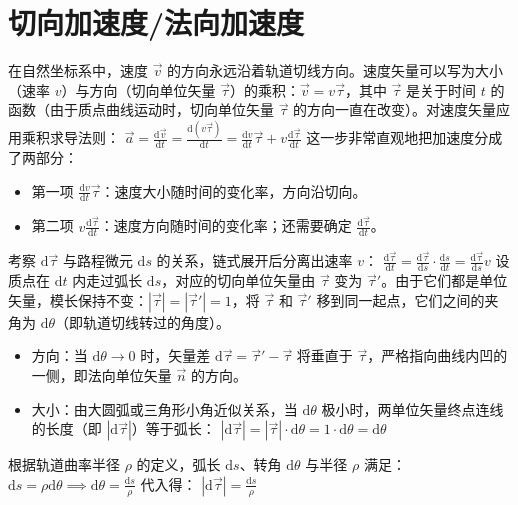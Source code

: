 \section{切向加速度/法向加速度}

在自然坐标系中，速度 $\vec{v}$ 的方向永远沿着轨道切线方向。速度矢量可以写为大小（速率 $v$）与方向（切向单位矢量 $\vec{\tau}$）的乘积：$\vec{v} = v\vec{\tau}$，其中 $\vec{\tau}$ 是关于时间 $t$ 的函数（由于质点曲线运动时，切向单位矢量 $\vec{\tau}$ 的方向一直在改变）。对速度矢量应用乘积求导法则： \(\vec{a} = \frac{\mathrm{d}\vec{v}}{\mathrm{d}t} = \frac{\mathrm{d}(v\vec{\tau})}{\mathrm{d}t} = \frac{\mathrm{d}v}{\mathrm{d}t}\vec{\tau} + v\frac{\mathrm{d}\vec{\tau}}{\mathrm{d}t}\) 
这一步非常直观地把加速度分成了两部分：
\begin{itemize}
\item 第一项 $\frac{\mathrm{d}v}{\mathrm{d}t}\vec{\tau}$：速度大小随时间的变化率，方向沿切向。
\item 第二项 $v\frac{\mathrm{d}\vec{\tau}}{\mathrm{d}t}$：速度方向随时间的变化率；还需要确定 $\frac{\mathrm{d}\vec{\tau}}{\mathrm{d}t}$。
\end{itemize}
考察 $\mathrm{d}\vec{\tau}$ 与路程微元 $\mathrm{d}s$ 的关系，链式展开后分离出速率 $v$：
 \(\frac{\mathrm{d}\vec{\tau}}{\mathrm{d}t} = \frac{\mathrm{d}\vec{\tau}}{\mathrm{d}s} \cdot \frac{\mathrm{d}s}{\mathrm{d}t} = \frac{\mathrm{d}\vec{\tau}}{\mathrm{d}s} v\) 
设质点在 $\mathrm{d}t$ 内走过弧长 $\mathrm{d}s$，对应的切向单位矢量由 $\vec{\tau}$ 变为 $\vec{\tau}'$。由于它们都是单位矢量，模长保持不变：$|\vec{\tau}| = |\vec{\tau}'| = 1$，将 $\vec{\tau}$ 和 $\vec{\tau}'$ 移到同一起点，它们之间的夹角为 $\mathrm{d}\theta$（即轨道切线转过的角度）。
\begin{itemize}
\item 方向：当 $\mathrm{d}\theta \to 0$ 时，矢量差 $\mathrm{d}\vec{\tau} = \vec{\tau}' - \vec{\tau}$ 将垂直于 $\vec{\tau}$，严格指向曲线内凹的一侧，即法向单位矢量 $\vec{n}$ 的方向。
\item 大小：由大圆弧或三角形小角近似关系，当 $\mathrm{d}\theta$ 极小时，两单位矢量终点连线的长度（即 $|\mathrm{d}\vec{\tau}|$）等于弧长： \(|\mathrm{d}\vec{\tau}| = |\vec{\tau}| \cdot \mathrm{d}\theta = 1 \cdot \mathrm{d}\theta = \mathrm{d}\theta\) 
\end{itemize}
根据轨道曲率半径 $\rho$ 的定义，弧长 $\mathrm{d}s$、转角 $\mathrm{d}\theta$ 与半径 $\rho$ 满足：
 \(\mathrm{d}s = \rho \mathrm{d}\theta \implies \mathrm{d}\theta = \frac{\mathrm{d}s}{\rho}\) 
代入得： \(|\mathrm{d}\vec{\tau}| = \frac{\mathrm{d}s}{\rho}\) 
